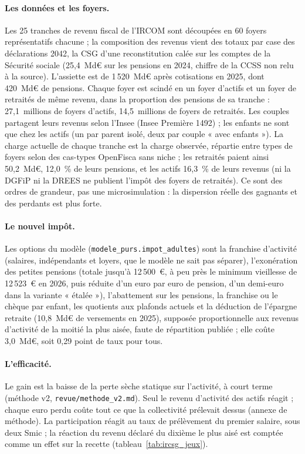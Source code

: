 \paragraph{Les données et les foyers.} Les 25 tranches de revenu fiscal de l'IRCOM sont découpées en 60 foyers
représentatifs chacune ; la composition des revenus vient des totaux par case des déclarations 2042, la CSG d'une
reconstitution calée sur les comptes de la Sécurité sociale (25,4~Md€ sur les pensions en 2024, chiffre de la CCSS non
relu à la source). L'assiette est de 1\,520~Md€ après cotisations en 2025, dont 420~Md€ de pensions. Chaque foyer est
scindé en un foyer d'actifs et un foyer de retraités de même revenu, dans la proportion des pensions de sa tranche :
27,1~millions de foyers d'actifs, 14,5~millions de foyers de retraités. Les couples partagent leurs revenus selon
l'Insee (Insee Première 1492) ; les enfants ne sont que chez les actifs (un par parent isolé, deux par couple « avec
enfants »). La charge actuelle de chaque tranche est la charge observée, répartie entre types de foyers selon des
cas-types OpenFisca sans niche ; les retraités paient ainsi 50,2~Md€, 12,0~\% de leurs pensions, et les actifs 16,3~\%
de leurs revenus (ni la DGFiP ni la DREES ne publient l'impôt des foyers de retraités). Ce sont des ordres de grandeur,
pas une microsimulation : la dispersion réelle des gagnants et des perdants est plus forte.

\paragraph{Le nouvel impôt.} Les options du modèle (\texttt{modele\_purs.impot\_adultes}) sont la franchise d'activité
(salaires, indépendants et loyers, que le modèle ne sait pas séparer), l'exonération des petites pensions (totale
jusqu'à 12\,500~€, à peu près le minimum vieillesse de 12\,523~€ en 2026, puis réduite d'un euro par euro de pension,
d'un demi-euro dans la variante « étalée »), l'abattement sur les pensions, la franchise ou le chèque par enfant, les
quotients aux plafonds actuels et la déduction de l'épargne retraite (10,8~Md€ de versements en 2025), supposée
proportionnelle aux revenus d'activité de la moitié la plus aisée, faute de répartition publiée ; elle coûte 3,0~Md€,
soit 0,29 point de taux pour tous.

\paragraph{L'efficacité.} Le gain est la baisse de la perte sèche statique sur l'activité, à court terme (méthode v2,
\texttt{revue/methode\_v2.md}). Seul le revenu d'activité des actifs réagit ; chaque euro perdu coûte tout ce que la
collectivité prélevait dessus (annexe de méthode). La participation réagit au taux de prélèvement du premier salaire,
sous deux Smic ; la réaction du revenu déclaré du dixième le plus aisé est comptée comme un effet sur la recette
(tableau~\ref{tab:ircsg_jeux}).

